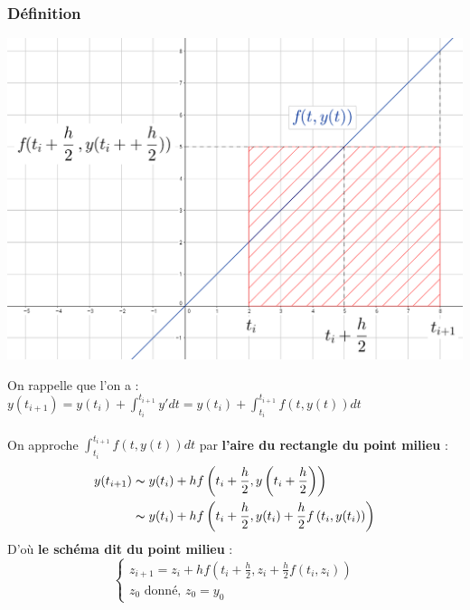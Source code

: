 \documentclass[a4paper,10pt]{report}
\begin{document}
\subsubsection{Définition}
\begin{minipage}{.41\linewidth}
\includegraphics[width=\textwidth]{rectangle_milieu.png}
\end{minipage} \hfill
\begin{minipage}{.05\linewidth}
\end{minipage} \hfill
\begin{minipage}{.53\linewidth}
On rappelle que l'on a :\\
$y(t_{i+1}) = y(t_i) + \int_{t_i}^{t_{i+1}} y'dt = y(t_i) + \int_{t_i}^{t_{i+1}} f(t,y(t))dt$\\ \\
On approche $\int_{t_i}^{t_{i+1}} f(t,y(t))dt$ par \textbf{l'aire du rectangle du point milieu} :
\abovedisplayskip=0mm
\begin{align*}
   y(t_{i+1}) & \thicksim y(t_i)+hf\left( t_i+\frac{h}{2}, y\left(t_i+\frac{h}{2}\right)\right) \\
			  & \thicksim y(t_i)+hf\left( t_i+\frac{h}{2}, y(t_i)+\frac{h}{2}f\left(t_i,y(t_i)\right)\right)
\end{align*}
D'où \textbf{le schéma dit du point milieu} :
\begin{equation}
\left\lbrace
\begin{array}{l}
z_{i+1}=z_i+hf\left(t_i+\frac{h}{2},z_i+\frac{h}{2}f(t_i,z_i)\right) \\
z_0 \text{ donné, } z_0=y_0
\end{array}\right.
\end{equation}
\end{minipage}
\end{document}

